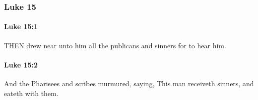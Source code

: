 	\subsubsection{Luke 15} %
		\label{LUKE-15}
		
		\paragraph{Luke 15:1} %
			\label{LUKE-15-1}

			THEN drew near unto him all the publicans and sinners for to hear him.

			\begin{framed}
			\scriptsize
				\begin{compactdesc}
					\item[SBLG] 
				\end{compactdesc}
			\end{framed}

		\paragraph{Luke 15:2} %
			\label{LUKE-15-2}

			And the Pharisees and scribes murmured, saying, This man receiveth sinners, and eateth with them.

